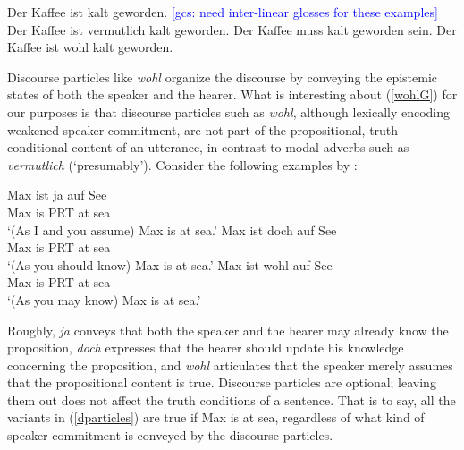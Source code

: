\documentclass[11pt]{article}
\newcommand{\gcs}[1]{\textcolor{blue}{[gcs: #1]}}
\begin{document}
\begin{exe}
	\ex\label{german} \begin{xlist}
		\ex\label{bareG} Der Kaffee ist kalt geworden. \gcs{need inter-linear glosses for these examples}
		\ex\label{probG} Der Kaffee ist vermutlich kalt geworden.
		\ex\label{mustG} Der Kaffee muss kalt geworden sein. 
		\ex\label{wohlG} Der Kaffee ist wohl kalt geworden.
	\end{xlist}
\end{exe}

Discourse particles like \emph{wohl} organize the discourse by conveying the epistemic states of both the speaker and the hearer. What is interesting about (\ref{wohlG}) for our purposes is that discourse particles such as \emph{wohl}, although lexically encoding weakened speaker commitment, are not part of the propositional, truth-conditional content of an utterance, in contrast to modal adverbs such as \emph{vermutlich} (`presumably’). Consider the following examples by \citet[][p.~2013]{Zimmermann2011}:

\begin{exe}
\ex \label{dparticles}
\begin{xlist}
\ex \gll Max ist	ja auf See\\
Max is	 PRT at sea\\
\trans `(As I and you assume) Max is at sea.'
\ex \gll Max ist doch auf See\\
Max is	 PRT at sea\\
\trans `(As you should know) Max is at sea.'
\ex \gll Max ist wohl auf See\\
Max is	PRT at	sea\\
\trans `(As you may know) Max is at sea.'
\end{xlist}
\end{exe}

Roughly, \emph{ja} conveys that both the speaker and the hearer may already know the proposition, \emph{doch} expresses that the hearer should update his knowledge concerning the proposition, and \emph{wohl} articulates that the speaker merely assumes that the propositional content is true. Discourse particles are optional; leaving them out does not affect the truth conditions of a sentence. That is to say, all the variants in (\ref{dparticles}) are true if Max is at sea, regardless of what kind of speaker commitment is conveyed by the discourse particles.

\end{document}
